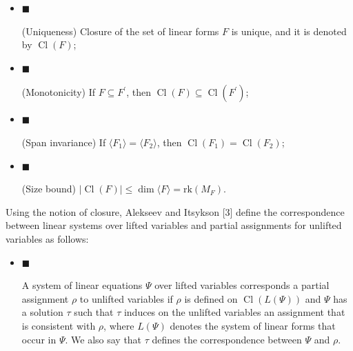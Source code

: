 \begin{itemize}


\item 
$\blacksquare$ 


(Uniqueness) Closure of the set of linear forms $F$ is unique, and it is denoted by $\mathop{\mathrm{Cl}}(F)$;\par





\item 
$\blacksquare$ 


(Monotonicity) If $F\subseteq F^{\prime}$, then $\mathop{\mathrm{Cl}}(F)\subseteq\mathop{\mathrm{Cl}}(F^{\prime})$;\par





\item 
$\blacksquare$ 


(Span invariance) If $\langle F_{1}\rangle=\langle F_{2}\rangle$, then $\mathop{\mathrm{Cl}}(F_{1})=\mathop{\mathrm{Cl}}(F_{2})$;\par





\item 
$\blacksquare$ 


(Size bound) $|\mathop{\mathrm{Cl}}(F)|\leq\dim\langle F\rangle=\mathrm{rk}\left(M_{F}\right)$.\par





\end{itemize}



Using the notion of closure, Alekseev and Itsykson [3] define the correspondence between linear systems over lifted variables and partial assignments for unlifted variables as follows:\par


\begin{itemize}


\item 
$\blacksquare$ 


A system of linear equations $\Psi$ over lifted variables corresponds a partial assignment $\rho$ to unlifted variables if $\rho$ is defined on $\mathop{\mathrm{Cl}}(L(\Psi))$ and $\Psi$ has a solution $\tau$ such that $\tau$ induces on the unlifted variables an assignment that is consistent with $\rho$, where $L(\Psi)$ denotes the system of linear forms that occur in $\Psi$. We also say that $\tau$ defines the correspondence between $\Psi$ and $\rho$.\par





\end{itemize}



